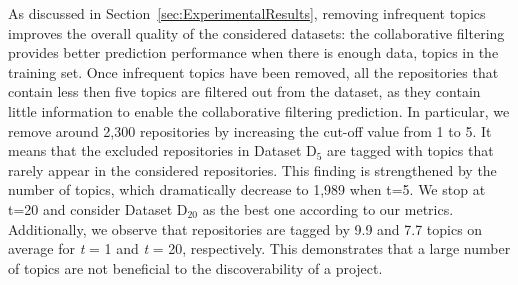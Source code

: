 As discussed in Section~\ref{sec:ExperimentalResults}, removing infrequent 
topics improves the overall quality of the considered datasets: %
the collaborative filtering provides better prediction performance when there is enough data, \ie topics in the training set. %
Once infrequent topics have been removed, all the repositories that contain 
less then five topics are filtered out from the dataset, as they contain little 
information to enable the collaborative filtering prediction. In particular, we 
remove around 2,300 repositories by increasing the cut-off value from 1 to 5. 
It means that the excluded repositories in Dataset D$_5$ are tagged with topics 
that rarely appear in the considered repositories. This finding is strengthened 
by the number of topics, which dramatically decrease to 1,989 when t=5. %
We stop at t=20 and consider Dataset D$_{20}$ as the best one according to our metrics. Additionally, we observe that repositories are tagged by 9.9 and 7.7 topics on average for \emph{t} = 1 and \emph{t} = 20, respectively. This demonstrates that a large number of topics are not beneficial to the discoverability of a project.


 


